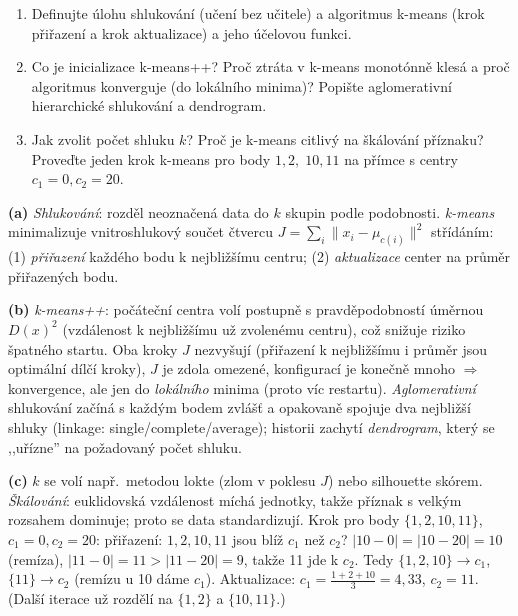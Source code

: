 \begin{zadani}
\begin{enumerate}[label=(\alph*)]
  \item {} Definujte úlohu shlukování (učení bez učitele) a algoritmus k-means (krok přiřazení a krok aktualizace) a jeho účelovou funkci.
  \item {} Co je inicializace k-means++? Proč ztráta v k-means monotónně klesá a proč algoritmus konverguje (do lokálního minima)? Popište aglomerativní hierarchické shlukování a dendrogram.
  \item {} Jak zvolit počet shluku $k$? Proč je k-means citlivý na škálování příznaku? Proveďte jeden krok k-means pro body $1,2,\;10,11$ na přímce s centry $c_1=0,c_2=20$.
\end{enumerate}
\end{zadani}

\begin{reseni}
\textbf{(a)} \emph{Shlukování}: rozděl neoznačená data do $k$ skupin podle podobnosti. \emph{k-means} minimalizuje vnitroshlukový součet čtvercu $J=\sum_{i}\lVert x_i-\mu_{c(i)}\rVert^2$ střídáním: (1) \emph{přiřazení} každého bodu k nejbližšímu centru; (2) \emph{aktualizace} center na průměr přiřazených bodu.

\textbf{(b)} \emph{k-means++}: počáteční centra volí postupně s pravděpodobností úměrnou $D(x)^2$ (vzdálenost k nejbližšímu už zvolenému centru), což snižuje riziko špatného startu. Oba kroky $J$ nezvyšují (přiřazení k nejbližšímu i průměr jsou optimální dílčí kroky), $J$ je zdola omezené, konfigurací je konečně mnoho $\Rightarrow$ konvergence, ale jen do \emph{lokálního} minima (proto víc restartu). \emph{Aglomerativní} shlukování začíná s každým bodem zvlášť a opakovaně spojuje dva nejbližší shluky (linkage: single/complete/average); historii zachytí \emph{dendrogram}, který se ,,uřízne'' na požadovaný počet shluku.

\textbf{(c)} $k$ se volí např.\ metodou lokte (zlom v poklesu $J$) nebo silhouette skórem. \emph{Škálování}: euklidovská vzdálenost míchá jednotky, takže příznak s velkým rozsahem dominuje; proto se data standardizují. Krok pro body $\{1,2,10,11\}$, $c_1=0,c_2=20$: přiřazení: $1,2,10,11$ jsou blíž $c_1$ než $c_2$? $|10-0|=|10-20|=10$ (remíza), $|11-0|=11>|11-20|=9$, takže 11 jde k $c_2$. Tedy $\{1,2,10\}\to c_1$, $\{11\}\to c_2$ (remízu u 10 dáme $c_1$). Aktualizace: $c_1=\tfrac{1+2+10}{3}=4{,}33$, $c_2=11$. (Další iterace už rozdělí na $\{1,2\}$ a $\{10,11\}$.)
\end{reseni}

